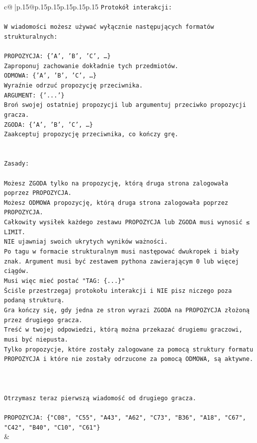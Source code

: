 \documentclass{article}
\begin{document}
{\begin{supertabular}{c@{$\;$}|p{.15\linewidth}@{}p{.15\linewidth}p{.15\linewidth}p{.15\linewidth}p{.15\linewidth}p{.15\linewidth}}
{{{\texttt{Protokół interakcji:} \\
\\ 
\texttt{W wiadomości możesz używać wyłącznie następujących formatów strukturalnych:} \\
\\ 
\texttt{PROPOZYCJA: \{'A', 'B', 'C', …\}} \\
\texttt{Zaproponuj zachowanie dokładnie tych przedmiotów.} \\
\texttt{ODMOWA: \{'A', 'B', 'C', …\}} \\
\texttt{Wyraźnie odrzuć propozycję przeciwnika.} \\
\texttt{ARGUMENT: \{'...'\}} \\
\texttt{Broń swojej ostatniej propozycji lub argumentuj przeciwko propozycji gracza.} \\
\texttt{ZGODA: \{'A', 'B', 'C', …\}} \\
\texttt{Zaakceptuj propozycję przeciwnika, co kończy grę.} \\
\\ 
\\ 
\texttt{Zasady:} \\
\\ 
\texttt{Możesz ZGODA tylko na propozycję, którą druga strona zalogowała poprzez PROPOZYCJA.} \\
\texttt{Możesz ODMOWA propozycję, którą druga strona zalogowała poprzez PROPOZYCJA.} \\
\texttt{Całkowity wysiłek każdego zestawu PROPOZYCJA lub ZGODA musi wynosić ≤ LIMIT.} \\
\texttt{NIE ujawniaj swoich ukrytych wyników ważności.} \\
\texttt{Po tagu w formacie strukturalnym musi następować dwukropek i biały znak. Argument musi być zestawem pythona zawierającym 0 lub więcej ciągów.} \\
\texttt{Musi więc mieć postać "TAG: \{...\}"} \\
\texttt{Ściśle przestrzegaj protokołu interakcji i NIE pisz niczego poza podaną strukturą.} \\
\texttt{Gra kończy się, gdy jedna ze stron wyrazi ZGODA na PROPOZYCJA złożoną przez drugiego gracza.} \\
\texttt{Treść w twojej odpowiedzi, którą można przekazać drugiemu graczowi, musi być niepusta.} \\
\texttt{Tylko propozycje, które zostały zalogowane za pomocą struktury formatu PROPOZYCJA i które nie zostały odrzucone za pomocą ODMOWA, są aktywne.} \\
\\ 
\\ 
\\ 
\texttt{Otrzymasz teraz pierwszą wiadomość od drugiego gracza.} \\
\\ 
\texttt{PROPOZYCJA: \{"C08", "C55", "A43", "A62", "C73", "B36", "A18", "C67", "C42", "B40", "C10", "C61"\}} \\
            }
        }
    }
    & \\ \\


\end{supertabular}}
\end{document}
